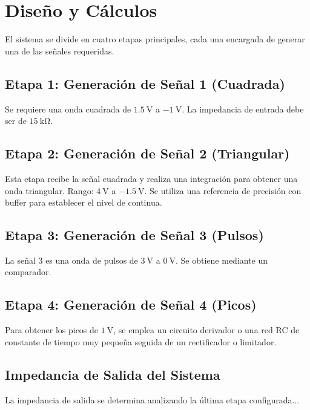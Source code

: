 \chapter{Diseño y Cálculos}
\label{chap:diseno-calculos}

El sistema se divide en cuatro etapas principales, cada una encargada de generar una de las señales requeridas.

\section{Etapa 1: Generación de Señal 1 (Cuadrada)}
Se requiere una onda cuadrada de $\SI{1.5}{\volt}$ a $\SI{-1}{\volt}$. 
La impedancia de entrada debe ser de $\SI{15}{\kilo\ohm}$.


\section{Etapa 2: Generación de Señal 2 (Triangular)}
Esta etapa recibe la señal cuadrada y realiza una integración para obtener una onda triangular. 
Rango: $\SI{4}{\volt}$ a $\SI{-1.5}{\volt}$.
Se utiliza una referencia de precisión con buffer para establecer el nivel de continua.


\section{Etapa 3: Generación de Señal 3 (Pulsos)}
La señal 3 es una onda de pulsos de $\SI{3}{\volt}$ a $\SI{0}{\volt}$. Se obtiene mediante un comparador.

\section{Etapa 4: Generación de Señal 4 (Picos)}
Para obtener los picos de $\SI{1}{\volt}$, se emplea un circuito derivador o una red RC de constante de tiempo muy pequeña seguida de un rectificador o limitador.

\section{Impedancia de Salida del Sistema}
La impedancia de salida se determina analizando la última etapa configurada...
